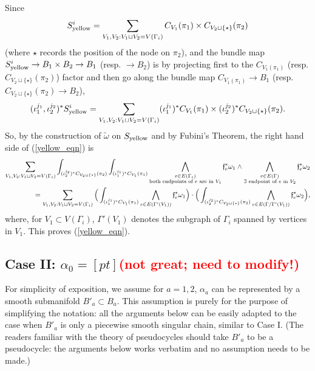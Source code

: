 \documentclass[11pt]{article}
\theoremstyle{definition}
\theoremstyle{remark}
\def\wt#1{\widetilde{#1}}
\def\syellow{{\textnormal{yellow}}}
\def\ff{\mathfrak{f}}
\def\cmt#1{\textcolor{red}{(#1)}}
\def\tn#1{\textnormal{#1}}
\begin{document}
Since
$$S_{\syellow}^i=
\sum_{V_1,V_2:V_1\sqcup V_2=V(\Gamma_i)}
{C}_{V_1}(\pi_1)\times{C}_{V_2\sqcup\{\star\}}(\pi_2)
$$
(where $\star$ records the position of the node on $\pi_2$), 
and the bundle map $S_{\syellow}^i\to B_1\times B_2\to B_1$  (resp. $\to B_2$) is by projecting first to the $C_{V_1(\pi_1)}$ (resp. $C_{V_2\sqcup\{\star\}}(\pi_2)$) factor and then go along the bundle map $C_{V_1(\pi_1)}\to B_1$ (resp. $C_{V_2\sqcup\{\star\}}(\pi_2)\to B_2$), 
$$(\iota_1^{j_1},\iota_2^{j_2})^*S_{\syellow}^i=\sum_{V_1,V_2:V_1\sqcup V_2=V(\Gamma_i)}(\iota_1^{j_1})^*C_{V_1}(\pi_1)\times(\iota_2^{j_2})^*C_{V_2\sqcup\{\star\}}(\pi_2).$$
So, by the construction of $\wt\omega$ on $S_{\syellow}$ and by Fubini's Theorem, the right hand side of (\ref{yellow_eqn}) is
\begin{align*}
\sum_{V_1,V_2:V_1\sqcup V_2=V(\Gamma_i)}
\int_{(\iota_2^{j_2})^*{C}_{V_2\sqcup\{\star\}}(\pi_2)}\int_{(\iota_1^{j_1})^*{C}_{V_1}(\pi_1)}
\bigwedge_{\begin{subarray}{c}e\in E(\Gamma_i)\\\tn{both endpoints of }e\tn{ are in }V_1\end{subarray}}\ff_e^*{\omega_1}\wedge
\bigwedge_{\begin{subarray}{c}e\in E(\Gamma)\\ \exists\tn{ endpoint of }e\tn{ in }V_2\end{subarray}}\ff_e^*{\omega_2}\\
=\sum_{V_1,V_2:V_1\sqcup V_2=V(\Gamma_i)}
\Big(\int_{(\iota_1^{j_1})^*{C}_{V_1}(\pi_1)}
\bigwedge_{e\in E(\Gamma'(V_1))} 
\ff_e^*{\omega_1}\Big)
\cdot
\Big(\int_{(\iota_2^{j_2})^*{C}_{V_2\sqcup\{\star\}}(\pi_2)}
\bigwedge_{e\in E(\Gamma/\Gamma'(V_1))}
\ff_e^*{\omega_2}\Big), 
\end{align*}
where, for $V_1\subset V(\Gamma_i)$, $\Gamma'(V_1)$ denotes the subgraph of $\Gamma_i$ spanned by vertices in $V_1$. 
This proves (\ref{yellow_eqn}). 

\subsection*{Case II: $\alpha_0=[pt]$\cmt{not great; need to modify!}}

For simplicity of exposition, we assume for $a=1,2$, $\alpha_a$ can be represented by a smooth submanifold $B'_a\subset B_a$. 
This assumption is purely for the purpose of simplifying the notation: all the arguments below can be easily adapted to the case when $B'_a$ is only a piecewise smooth singular chain, similar to Case I. 
(The readers familiar with the theory of pseudocycles should take $B'_a$ to be a pseudocycle: the arguments below works verbatim and no assumption needs to be made.)
\end{document}
